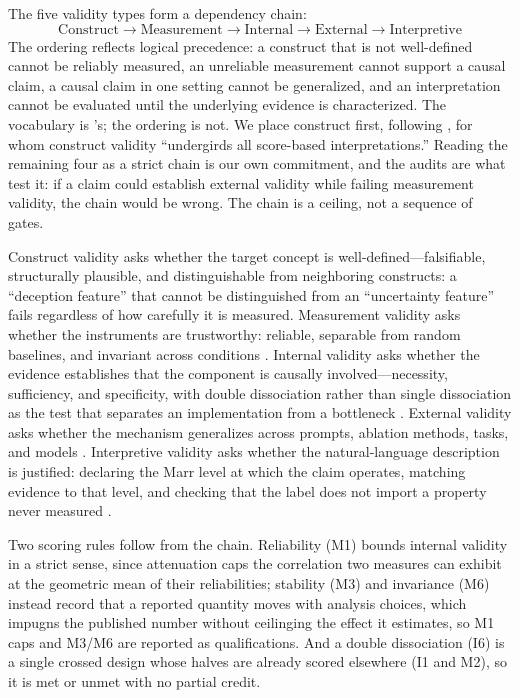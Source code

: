 \documentclass{article}
\begin{document}
The five validity types form a dependency chain:
\begin{equation}
\text{Construct} \rightarrow \text{Measurement} \rightarrow \text{Internal} \rightarrow \text{External} \rightarrow \text{Interpretive}
\label{eq:dependency}
\end{equation}
The ordering reflects logical precedence: a construct that is not well-defined cannot be reliably measured, an unreliable measurement cannot support a causal claim, a causal claim in one setting cannot be generalized, and an interpretation cannot be evaluated until the underlying evidence is characterized. The vocabulary is \citeauthor{shadish2002experimental}'s; the ordering is not. We place construct first, following \citet{messick1995validity}, for whom construct validity ``undergirds all score-based interpretations.'' Reading the remaining four as a strict chain is our own commitment, and the audits are what test it: if a claim could establish external validity while failing measurement validity, the chain would be wrong. The chain is a ceiling, not a sequence of gates.

Construct validity asks whether the target concept is well-defined---falsifiable, structurally plausible, and distinguishable from neighboring constructs: a ``deception feature'' that cannot be distinguished from an ``uncertainty feature'' fails regardless of how carefully it is measured. Measurement validity asks whether the instruments are trustworthy: reliable, separable from random baselines, and invariant across conditions \citep{borsboom2004concept}. Internal validity asks whether the evidence establishes that the component is causally involved---necessity, sufficiency, and specificity, with double dissociation rather than single dissociation as the test that separates an implementation from a bottleneck \citep{shallice1988neuropsychology, craver2007explaining, pearl2009causality}. External validity asks whether the mechanism generalizes across prompts, ablation methods, tasks, and models \citep{pearl2011transportability}. Interpretive validity asks whether the natural-language description is justified: declaring the Marr level at which the claim operates, matching evidence to that level, and checking that the label does not import a property never measured \citep{marr1982vision, messick1995validity}.

Two scoring rules follow from the chain. Reliability (M1) bounds internal validity in a strict sense, since attenuation caps the correlation two measures can exhibit at the geometric mean of their reliabilities; stability (M3) and invariance (M6) instead record that a reported quantity moves with analysis choices, which impugns the published number without ceilinging the effect it estimates, so M1 caps and M3/M6 are reported as qualifications. And a double dissociation (I6) is a single crossed design whose halves are already scored elsewhere (I1 and M2), so it is met or unmet with no partial credit.
\end{document}
